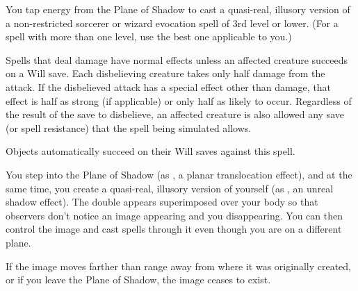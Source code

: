 \begin{spelleffect}
  You tap energy from the Plane of Shadow to cast a quasi-real, illusory version of a non-restricted sorcerer or wizard evocation spell of 3rd level or lower. (For a spell with more than one level, use the best one applicable to you.)
  \par Spells that deal damage have normal effects unless an affected creature succeeds on a Will save. Each disbelieving creature takes only half damage from the attack. If the disbelieved attack has a special effect other than damage, that effect is half as strong (if applicable) or only half as likely to occur. Regardless of the result of the save to disbelieve, an affected creature is also allowed any save (or spell resistance) that the spell being simulated allows.
\end{spelleffect}
\begin{spellnotes}
  Objects automatically succeed on their Will saves against this spell.
\end{spellnotes}

\spelldur{\durmed}
\begin{spelleffect}
  You step into the Plane of Shadow (as , a planar translocation effect), and at the same time, you create a quasi-real, illusory version of yourself (as , an unreal shadow effect). The double appears superimposed over your body so that observers don't notice an image appearing and you disappearing. You can then control the image and cast spells through it even though you are on a different plane.
\end{spelleffect}
\begin{spellnotes}
  If the image moves farther than \rngfar range away from where it was originally created, or if you leave the Plane of Shadow, the image ceases to exist.
\end{spellnotes}

